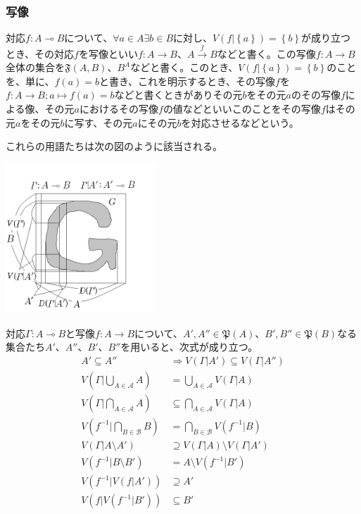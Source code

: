 \documentclass[dvipdfmx]{jsarticle}
\begin{document}
\subsubsection{写像}%
対応$f:A \multimap B$について、$\forall a \in A\exists b \in B$に対し、$V\left( f|\left\{ a \right\} \right) = \left\{ b \right\}$が成り立つとき、その対応$f$を写像といい$f:A \rightarrow B$、$A\overset{f}{\rightarrow}B$などと書く。この写像$f:A \rightarrow B$全体の集合を$\mathfrak{F}(A,B)$、$B^{A}$などと書く。このとき、$V\left( f|\left\{ a \right\} \right) = \left\{ b \right\}$のことを、単に、$f(a) = b$と書き、これを明示するとき、その写像$f$を$f:A \rightarrow B;a \mapsto f(a) = b$などと書くときがありその元$b$をその元$a$のその写像$f$による像、その元$a$におけるその写像$f$の値などといいこのことをその写像$f$はその元$a$をその元$b$に写す、その元$a$にその元$b$を対応させるなどという。\par
これらの用語たちは次の図のように該当される。
\begin{center}
\includegraphics[width=160pt]{1.2.1.a.png}
\end{center}
\begin{thm}
\label{1.2.3.3}
対応$\varGamma:A \multimap B$と写像$f:A \rightarrow B$について、$A',A''\in \mathfrak{P}(A)$、$B',B''\in \mathfrak{P}(B)$なる集合たち$A'$、$A''$、$B'$、$B''$を用いると、次式が成り立つ。
\begin{align*}
A' \subseteq A'' &\Rightarrow V\left( \varGamma|A' \right) \subseteq V\left( \varGamma|A'' \right)\\
V\left( \varGamma|\bigcup_{A \in \mathcal{A}} A \right) &= \bigcup_{A \in \mathcal{A}} {V\left( \varGamma|A \right)}\\
V\left( \varGamma|\bigcap_{A \in \mathcal{A}} A \right) &\subseteq \bigcap_{A \in \mathcal{A}} {V\left( \varGamma|A \right)}\\
V\left( f^{- 1}|\bigcap_{B\in \mathcal{B}} B \right) &= \bigcap_{B\in \mathcal{B}} {V\left( f^{- 1}|B \right)}\\
V\left( \varGamma|A \setminus A' \right) &\supseteq V\left( \varGamma|A \right) \setminus V\left( \varGamma|A' \right)\\
V\left( f^{- 1}|B \setminus B' \right) &= A \setminus V\left( f^{- 1}|B' \right)\\
V\left( f^{- 1}|V\left( f|A' \right) \right) &\supseteq A'\\
V\left( f|V\left( f^{- 1}|B' \right) \right) &\subseteq B'
\end{align*}
\end{thm}
\end{document}
